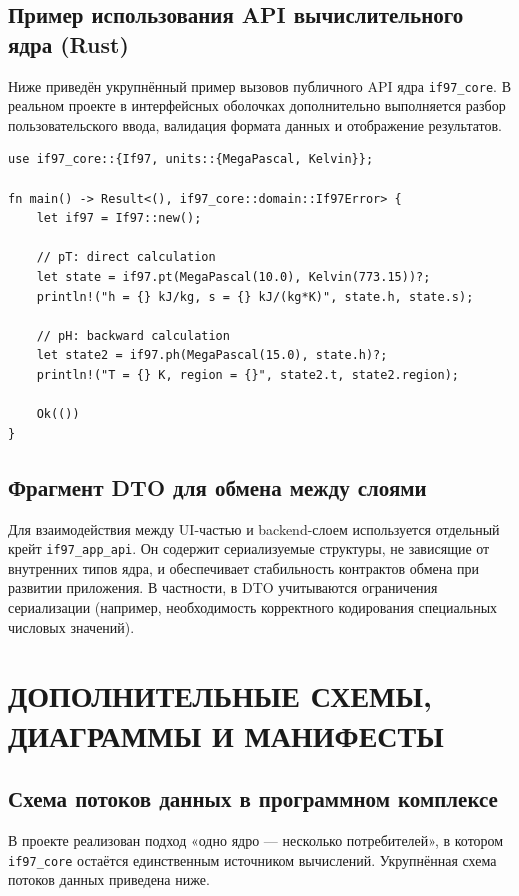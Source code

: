 \begin{appendices}
\section{Пример использования API вычислительного ядра (Rust)}

Ниже приведён укрупнённый пример вызовов публичного API ядра \texttt{if97\_core}.  
В реальном проекте в интерфейсных оболочках дополнительно выполняется разбор пользовательского ввода, валидация формата данных и отображение результатов.  

\begin{verbatim}
use if97_core::{If97, units::{MegaPascal, Kelvin}};

fn main() -> Result<(), if97_core::domain::If97Error> {
    let if97 = If97::new();

    // pT: direct calculation
    let state = if97.pt(MegaPascal(10.0), Kelvin(773.15))?;
    println!("h = {} kJ/kg, s = {} kJ/(kg*K)", state.h, state.s);

    // pH: backward calculation
    let state2 = if97.ph(MegaPascal(15.0), state.h)?;
    println!("T = {} K, region = {}", state2.t, state2.region);

    Ok(())
}
\end{verbatim}

\section{Фрагмент DTO для обмена между слоями}

Для взаимодействия между UI-частью и backend-слоем используется отдельный крейт \texttt{if97\_app\_api}.  
Он содержит сериализуемые структуры, не зависящие от внутренних типов ядра, и обеспечивает стабильность контрактов обмена при развитии приложения.  
В частности, в DTO учитываются ограничения сериализации (например, необходимость корректного кодирования специальных числовых значений).  

\chapter{ДОПОЛНИТЕЛЬНЫЕ СХЕМЫ, ДИАГРАММЫ И МАНИФЕСТЫ}

\section{Схема потоков данных в программном комплексе}

В проекте реализован подход «одно ядро --- несколько потребителей», в котором \texttt{if97\_core} остаётся единственным источником вычислений.  
Укрупнённая схема потоков данных приведена ниже.  


\end{appendices}
